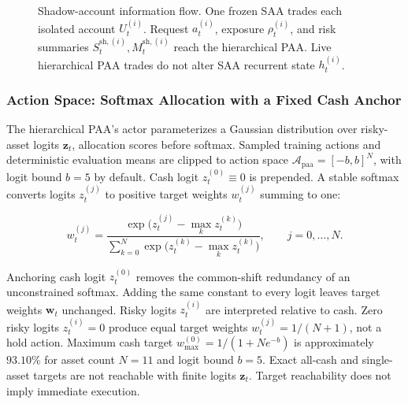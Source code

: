 \begin{figure}[htbp]
\caption{Shadow-account information flow. One frozen SAA trades each isolated account \(U_t^{(i)}\). Request \(a_t^{(i)}\), exposure \(\rho_t^{(i)}\), and risk summaries \(S_t^{\mathrm{sh},(i)},M_t^{\mathrm{sh},(i)}\) reach the hierarchical PAA. Live hierarchical PAA trades do not alter SAA recurrent state \(h_t^{(i)}\).}
\label{fig:shadow-flow}
\end{figure}

\subsubsection{Action Space: Softmax Allocation with a Fixed Cash Anchor}
\label{sec:paa-action}

The hierarchical PAA's actor parameterizes a Gaussian distribution over risky-asset logits \(\mathbf z_t\), allocation scores before softmax. Sampled training actions and deterministic evaluation means are clipped to action space \(\mathcal A_{\mathrm{paa}}=[-b,b]^N\), with logit bound \(b=5\) by default. Cash logit \(z_t^{(0)}\equiv0\) is prepended. A stable softmax converts logits \(z_t^{(j)}\) to positive target weights \(w_t^{(j)}\) summing to one:

\begin{equation}
w_t^{(j)} = \frac{\exp\big(z_t^{(j)} - \max_k z_t^{(k)}\big)}{\sum_{k=0}^{N} \exp\big(z_t^{(k)} - \max_k z_t^{(k)}\big)}, \qquad j = 0, \dots, N.
\label{eq:paa-softmax}
\end{equation}

Anchoring cash logit \(z_t^{(0)}\) removes the common-shift redundancy of an unconstrained softmax. Adding the same constant to every logit leaves target weights \(\mathbf w_t\) unchanged. Risky logits \(z_t^{(i)}\) are interpreted relative to cash. Zero risky logits \(z_t^{(i)}=0\) produce equal target weights \(w_t^{(j)}=1/(N+1)\), not a hold action. Maximum cash target \(w_{\max}^{(0)}=1/(1+Ne^{-b})\) is approximately \(93.10\%\) for asset count \(N=11\) and logit bound \(b=5\). Exact all-cash and single-asset targets are not reachable with finite logits \(\mathbf z_t\). Target reachability does not imply immediate execution.

